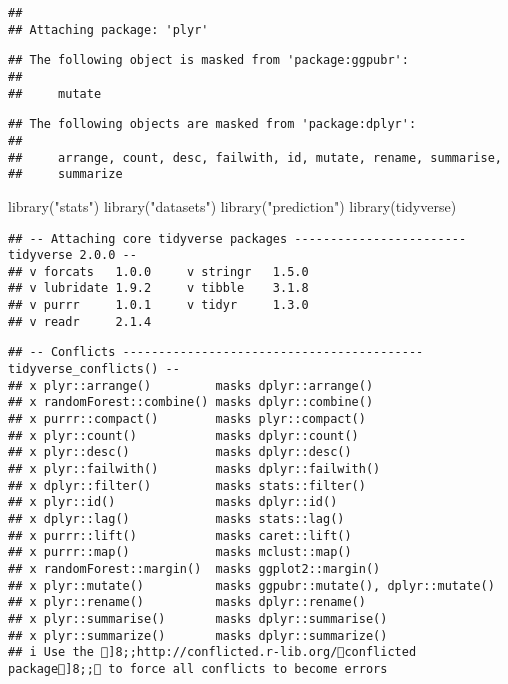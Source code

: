 \documentclass[
]{article}
\newenvironment{Shaded}{\begin{snugshade}}{\end{snugshade}}
\newcommand{\FunctionTok}[1]{\textcolor[rgb]{0.00,0.00,0.00}{#1}}
\newcommand{\NormalTok}[1]{#1}
\newcommand{\StringTok}[1]{\textcolor[rgb]{0.31,0.60,0.02}{#1}}
\begin{document}
\begin{verbatim}
## 
## Attaching package: 'plyr'
\end{verbatim}

\begin{verbatim}
## The following object is masked from 'package:ggpubr':
## 
##     mutate
\end{verbatim}

\begin{verbatim}
## The following objects are masked from 'package:dplyr':
## 
##     arrange, count, desc, failwith, id, mutate, rename, summarise,
##     summarize
\end{verbatim}

\begin{Shaded}
\begin{Highlighting}[]
\FunctionTok{library}\NormalTok{(}\StringTok{"stats"}\NormalTok{)}
\FunctionTok{library}\NormalTok{(}\StringTok{"datasets"}\NormalTok{)}
\FunctionTok{library}\NormalTok{(}\StringTok{"prediction"}\NormalTok{)}
\FunctionTok{library}\NormalTok{(tidyverse)}
\end{Highlighting}
\end{Shaded}

\begin{verbatim}
## -- Attaching core tidyverse packages ------------------------ tidyverse 2.0.0 --
## v forcats   1.0.0     v stringr   1.5.0
## v lubridate 1.9.2     v tibble    3.1.8
## v purrr     1.0.1     v tidyr     1.3.0
## v readr     2.1.4
\end{verbatim}

\begin{verbatim}
## -- Conflicts ------------------------------------------ tidyverse_conflicts() --
## x plyr::arrange()         masks dplyr::arrange()
## x randomForest::combine() masks dplyr::combine()
## x purrr::compact()        masks plyr::compact()
## x plyr::count()           masks dplyr::count()
## x plyr::desc()            masks dplyr::desc()
## x plyr::failwith()        masks dplyr::failwith()
## x dplyr::filter()         masks stats::filter()
## x plyr::id()              masks dplyr::id()
## x dplyr::lag()            masks stats::lag()
## x purrr::lift()           masks caret::lift()
## x purrr::map()            masks mclust::map()
## x randomForest::margin()  masks ggplot2::margin()
## x plyr::mutate()          masks ggpubr::mutate(), dplyr::mutate()
## x plyr::rename()          masks dplyr::rename()
## x plyr::summarise()       masks dplyr::summarise()
## x plyr::summarize()       masks dplyr::summarize()
## i Use the ]8;;http://conflicted.r-lib.org/conflicted package]8;; to force all conflicts to become errors
\end{verbatim}
\end{document}
